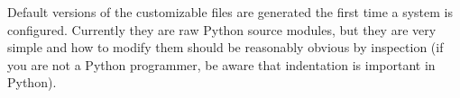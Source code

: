 Default versions of the customizable files are generated the first
time a system is configured. Currently they are raw Python source
modules, but they are very simple and how to modify them should be
reasonably obvious by inspection (if you are not a Python programmer,
be aware that indentation is important in Python). 
